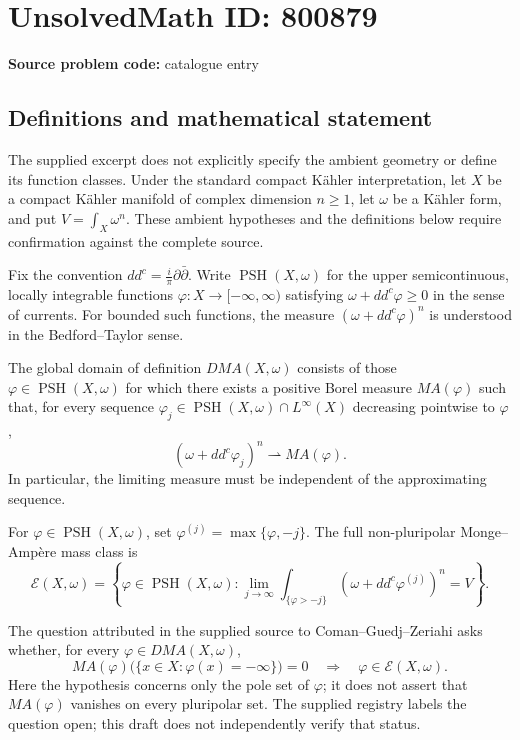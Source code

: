 \documentclass[11pt]{article}
\begin{document}
\section*{UnsolvedMath ID: 800879}
\textbf{Source problem code:} catalogue entry
\subsection{Definitions and mathematical statement}
The supplied excerpt does not explicitly specify the ambient geometry or define its function classes. Under the standard compact Kähler interpretation, let \(X\) be a compact Kähler manifold of complex dimension \(n\geq 1\), let \(\omega\) be a Kähler form, and put \(V=\int_X\omega^n\). These ambient hypotheses and the definitions below require confirmation against the complete source.

Fix the convention \(dd^c=\frac{i}{\pi}\partial\bar\partial\). Write \(\operatorname{PSH}(X,\omega)\) for the upper semicontinuous, locally integrable functions \(\varphi:X\to[-\infty,\infty)\) satisfying \(\omega+dd^c\varphi\geq 0\) in the sense of currents. For bounded such functions, the measure \((\omega+dd^c\varphi)^n\) is understood in the Bedford--Taylor sense.

The global domain of definition \(DMA(X,\omega)\) consists of those \(\varphi\in\operatorname{PSH}(X,\omega)\) for which there exists a positive Borel measure \(MA(\varphi)\) such that, for every sequence \(\varphi_j\in\operatorname{PSH}(X,\omega)\cap L^\infty(X)\) decreasing pointwise to \(\varphi\),
\[
(\omega+dd^c\varphi_j)^n\rightharpoonup MA(\varphi).
\]
In particular, the limiting measure must be independent of the approximating sequence.

For \(\varphi\in\operatorname{PSH}(X,\omega)\), set \(\varphi^{(j)}=\max\{\varphi,-j\}\). The full non-pluripolar Monge--Ampère mass class is
\[
\mathcal E(X,\omega)=\left\{\varphi\in\operatorname{PSH}(X,\omega):\lim_{j\to\infty}\int_{\{\varphi>-j\}}(\omega+dd^c\varphi^{(j)})^n=V\right\}.
\]

The question attributed in the supplied source to Coman--Guedj--Zeriahi asks whether, for every \(\varphi\in DMA(X,\omega)\),
\[
MA(\varphi)\bigl(\{x\in X:\varphi(x)=-\infty\}\bigr)=0
\quad\Longrightarrow\quad
\varphi\in\mathcal E(X,\omega).
\]
Here the hypothesis concerns only the pole set of \(\varphi\); it does not assert that \(MA(\varphi)\) vanishes on every pluripolar set. The supplied registry labels the question open; this draft does not independently verify that status.
\end{document}
